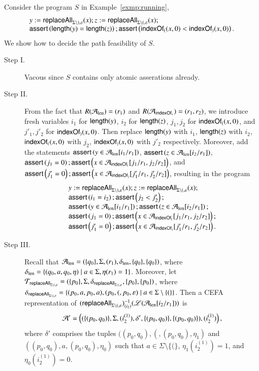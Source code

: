 \begin{example}
Consider the program $S$ in Example~\ref{exmp:running},
\[
\begin{array}{l}
y := \mathsf{replaceAll}_{\Sigma \setminus ), \varepsilon}(x); z:= \mathsf{replaceAll}_{\Sigma \setminus (, \varepsilon}(x);\\
\textsf{assert}\left(\mathsf{length}(y) = \mathsf{length}(z)\right); \textsf{assert}\left(\mathsf{indexOf}_{(}(x,0) < \mathsf{indexOf}_{)}(x,0)\right).
\end{array}
\] 
We show how to decide the path feasibility of $S$. 
\begin{description}
\item[Step I.]   Vacous since $S$ contains only atomic asserations already. %
%
\item[Step II.] From the fact that $R(\mathcal{A}_{\rm len})=(r_1)$ and $R(\mathcal{A}_{\mathsf{indexOf}_v})=(r_1,r_2)$, we introduce fresh variables $i_1$ for $\mathsf{length}(y)$, $i_2$ for $\mathsf{length}(z)$, $j_1, j_2$ for $\mathsf{indexOf}_{(}(x,0)$, and $j'_1,j'_2$ for $\mathsf{indexOf}_{)}(x,0)$. Then replace $\mathsf{length}(y)$ with $i_1$, $\mathsf{length}(z)$ with $i_2$, $\mathsf{indexOf}_{(}(x,0)$ with $j_2$, $\mathsf{indexOf}_{)}(x,0)$ with $j'_2$ respectively. Moreover, add the statements $\textsf{assert}\left(y \in \mathcal{A}_{\rm len}[i_1/r_1]\right)$, $\textsf{assert}\left(z \in \mathcal{A}_{\rm len}[i_2/r_1]\right)$, $\textsf{assert}\left(j_1 = 0\right); \textsf{assert}\left(x \in \mathcal{A}_{\mathsf{indexOf}_{(}}[j_1/r_1, j_2/r_2]\right)$, and $\textsf{assert}\left(j'_1 = 0\right); \textsf{assert}\left(x \in \mathcal{A}_{\mathsf{indexOf}_{)}}[j'_1/r_1, j'_2/r_2]\right)$, resulting in  the program 
\[
\begin{array}{l}
y := \mathsf{replaceAll}_{\Sigma \setminus ), \varepsilon}(x); z:= \mathsf{replaceAll}_{\Sigma \setminus (, \varepsilon}(x);\\
\textsf{assert}\left(i_1 = i_2\right); \textsf{assert}\left( j_2 < j'_2\right);\\
\textsf{assert}\left(y \in \mathcal{A}_{\rm len}[i_1/r_1]\right); \textsf{assert}\left(z \in \mathcal{A}_{\rm len}[i_2/r_1]\right);\\
\textsf{assert}\left(j_1 = 0\right); \textsf{assert}\left(x \in \mathcal{A}_{\mathsf{indexOf}_{(}}[j_1/r_1, j_2/r_2]\right);  \\
\textsf{assert}\left(j'_1 = 0\right); \textsf{assert}\left(x \in \mathcal{A}_{\mathsf{indexOf}_{)}}[j'_1/r_1, j'_2/r_2]\right).
\end{array}
\] 
%
\item[Step III.] Recall that $\mathcal{A}_{\rm len}=(\{q_0\}, \Sigma, (r_1), \delta_{\rm len}, \{q_0\}, \{q_0\})$, where $\delta_{\rm len} = \{(q_0, a, q_0, \eta) \mid a \in \Sigma, \eta(r_1)=1\}$. Moreover, let $\mathcal{T}_{\mathsf{replaceAll}_{\Sigma \setminus (, \varepsilon}} = (\{p_0\}, \Sigma, \delta_{\mathsf{replaceAll}_{\Sigma \setminus (, \varepsilon}}, \{p_0\}, \{p_0\})$, where $\delta_{\mathsf{replaceAll}_{\Sigma \setminus (, \varepsilon}} = \{(p_0, a, p_0, a), (p_0, (, p_0, \varepsilon) \mid a \in \Sigma \setminus \{(\}\}$. Then a CEFA representation of $(\mathsf{replaceAll}_{\Sigma \setminus (, \varepsilon})^{-1}_{(i_2)}(\mathscr{L}(\mathcal{A}_{\rm len}[i_2/r_1]))$ is 
%
\[\mathcal{A}' = \left((\{(p_0, q_0)\}, \Sigma, (i^{(1)}_2), \delta', \{(p_0, q_0)\}, \{(p_0, q_0)\}), (i^{(1)}_2)\right),\]
%
where $\delta'$ comprises the tuples $((p_0,q_0), (, (p_0,q_0), \eta_1)$ and $((p_0,q_0), a, (p_0,q_0), \eta_0)$ such that $a \in \Sigma \setminus \{(\}$, $\eta_1(i^{(1)}_2)=1$, and $\eta_0(i^{(1)}_2)=0$. 


\end{description}
\end{example}
